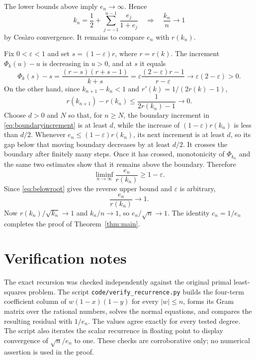 \documentclass[11pt]{article}
\begin{document}
The lower bounds above imply $e_n\to\infty$.  Hence
\[
 k_n=\frac12+\sum_{j=-1}^{n-1}\frac{e_j}{1+e_j}
 \quad\Longrightarrow\quad \frac{k_n}{n}\longrightarrow1
\]
by Ces\`aro convergence.  It remains to compare $e_n$ with $r(k_n)$.

Fix $0<\varepsilon<1$ and set $s=(1-\varepsilon)r$, where $r=r(k)$.
The increment $\Phi_k(u)-u$ is decreasing in $u>0$, and at $s$ it equals
\begin{equation}\label{eq:boundaryincrement}
 \Phi_k(s)-s
 =\frac{(r-s)(r+s-1)}{k+s}
 =\varepsilon\frac{(2-\varepsilon)r-1}{r-\varepsilon}
 \longrightarrow\varepsilon(2-\varepsilon)>0.
\end{equation}
On the other hand, since $k_{n+1}-k_n<1$ and
$r'(k)=1/(2r(k)-1)$,
\begin{equation}\label{eq:rootmotion}
 r(k_{n+1})-r(k_n)
 \le\frac1{2r(k_n)-1}\longrightarrow0.
\end{equation}
Choose $d>0$ and $N$ so that, for $n\ge N$, the boundary increment in
\eqref{eq:boundaryincrement} is at least $d$, while the increase of
$(1-\varepsilon)r(k_n)$ is less than $d/2$.  Whenever
$e_n\le(1-\varepsilon)r(k_n)$, its next increment is at least $d$, so its
gap below that moving boundary decreases by at least $d/2$.  It crosses the
boundary after finitely many steps.  Once it has crossed, monotonicity of
$\Phi_{k_n}$ and the same two estimates show that it remains above the
boundary.  Therefore
\[
 \liminf_{n\to\infty}\frac{e_n}{r(k_n)}\ge1-\varepsilon.
\]
Since \eqref{eq:belowroot} gives the reverse upper bound and $\varepsilon$ is
arbitrary,
\[
 \frac{e_n}{r(k_n)}\longrightarrow1.
\]
Now $r(k_n)/\sqrt{k_n}\to1$ and $k_n/n\to1$, so
$e_n/\sqrt n\to1$.  The identity $c_n=1/e_n$ completes the proof of
Theorem~\ref{thm:main}.

\section{Verification notes}

The exact recursion was checked independently against the original primal
least-squares problem.  The script \texttt{code/verify\_recurrence.py} builds
the four-term coefficient column of $w(1-x)(1-y)$ for every $|w|\le n$,
forms its Gram matrix over the rational numbers, solves the normal equations,
and compares the resulting residual with $1/e_n$.  The values agree exactly
for every tested degree.  The script also iterates the scalar recurrence in
floating point to display convergence of $\sqrt n/e_n$ to one.  These checks
are corroborative only; no numerical assertion is used in the proof.
\end{document}
